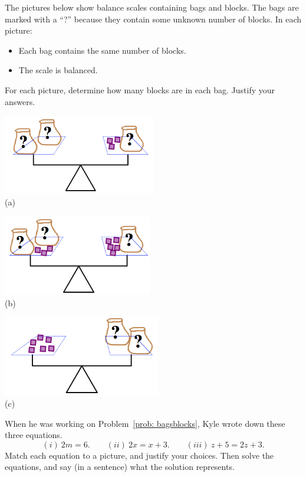 \bigskip


\begin{problem}\label{prob: bagsblocks}
The pictures below show balance scales containing bags and blocks.  The bags are marked with a ``?'' because they contain some unknown number of blocks.  In each picture:
\begin{itemize}
\item
Each bag contains the same number of blocks. 
\item
The scale is balanced.
\end{itemize}
For each picture, determine how many blocks are in each bag.  Justify your answers.

\begin{center}
\includegraphics[height=3.5cm]{bags1}\\
(a)

\bigskip

\includegraphics[height=3.5cm]{bags2}\\
(b)

\bigskip

\includegraphics[height=3.5cm]{bags3}\\
(c)


\end{center}
\end{problem}


\bigskip

\begin{problem}
When he was working on Problem~\ref{prob: bagsblocks}, Kyle wrote down these three equations.  
\[
(i)\ 2m = 6.
\qquad
(ii)\ 2x = x + 3.
\qquad
(iii)\ z + 5 = 2z + 3. 
\]
Match each equation to a picture, and justify your choices.  Then solve the equations, and say (in a sentence) what the solution represents.

\end{problem}

